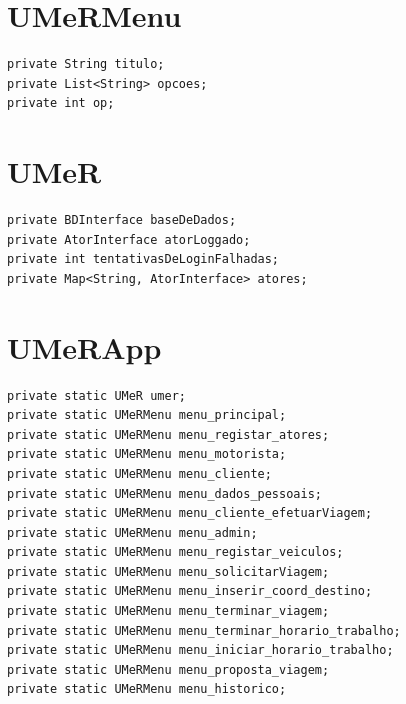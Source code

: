 \section{UMeRMenu}
\begin{verbatim}
private String titulo;
private List<String> opcoes;
private int op;
\end{verbatim}

\section{UMeR}
\begin{verbatim}
private BDInterface baseDeDados;
private AtorInterface atorLoggado;
private int tentativasDeLoginFalhadas;
private Map<String, AtorInterface> atores;
\end{verbatim}

\section{UMeRApp}
\begin{verbatim}
private static UMeR umer;
private static UMeRMenu menu_principal;
private static UMeRMenu menu_registar_atores;
private static UMeRMenu menu_motorista;
private static UMeRMenu menu_cliente;
private static UMeRMenu menu_dados_pessoais;
private static UMeRMenu menu_cliente_efetuarViagem;
private static UMeRMenu menu_admin;
private static UMeRMenu menu_registar_veiculos;
private static UMeRMenu menu_solicitarViagem; 
private static UMeRMenu menu_inserir_coord_destino;
private static UMeRMenu menu_terminar_viagem; 
private static UMeRMenu menu_terminar_horario_trabalho;
private static UMeRMenu menu_iniciar_horario_trabalho;
private static UMeRMenu menu_proposta_viagem;
private static UMeRMenu menu_historico;
\end{verbatim}




